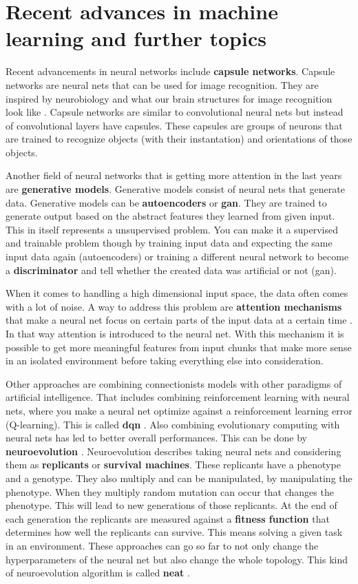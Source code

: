 \documentclass[jou,apacite]{apa6}
\begin{document}
\section{Recent advances in machine learning and further topics}
Recent advancements in neural networks include \textbf{capsule networks}. Capsule networks are neural nets that can be used for image recognition. They are inspired by neurobiology and what our brain structures for image recognition look like \cite{Sabour2017}. Capsule networks are similar to convolutional neural nets but instead of convolutional layers have capsules. These capsules are groups of neurons that are trained to recognize objects (with their instantation) and orientations of those objects.

Another field of neural networks that is getting more attention in the last years are \textbf{generative models}. Generative models consist of neural nets that generate data. Generative models can be \textbf{autoencoders} or \textbf{\gls{gan}}. They are trained to generate output based on the abstract features they learned from given input. This in itself represents a unsupervised problem. You can make it a supervised and trainable problem though by training input data and expecting the same input data again (autoencoders) or training a different neural network to become a \textbf{discriminator} and tell whether the created data was artificial or not (\gls{gan}).

When it comes to handling a high dimensional input space, the data often comes with a lot of noise. A way to address this problem are \textbf{attention mechanisms} that make a neural net focus on certain parts of the input data at a certain time \cite{Bahdanau2015}. In that way attention is introduced to the neural net. With this mechanism it is possible to get more meaningful features from input chunks that make more sense in an isolated environment before taking everything else into consideration.

Other approaches are combining connectionists models with other paradigms of artificial intelligence. That includes combining reinforcement learning with neural nets, where you make a neural net optimize against a reinforcement learning error (Q-learning). This is called \textbf{\gls{dqn}} \cite{Mnih2015}. Also combining evolutionary computing with neural nets has led to better overall performances. This can be done by \textbf{neuroevolution} \cite{Sher2013}. Neuroevolution describes taking neural nets and considering them as \textbf{replicants} or \textbf{survival machines}. These replicants have a phenotype and a genotype. They also multiply and can be manipulated, by manipulating the phenotype. When they multiply random mutation can occur that changes the phenotype. This will lead to new generations of those replicants. At the end of each generation the replicants are measured against a \textbf{fitness function} that determines how well the replicants can survive. This means solving a given task in an environment.
These approaches can go so far to not only change the hyperparameters of the neural net but also change the whole topology. This kind of neuroevolution algorithm is called \textbf{\gls{neat}} \cite{stanley:ec02}.
\end{document}
